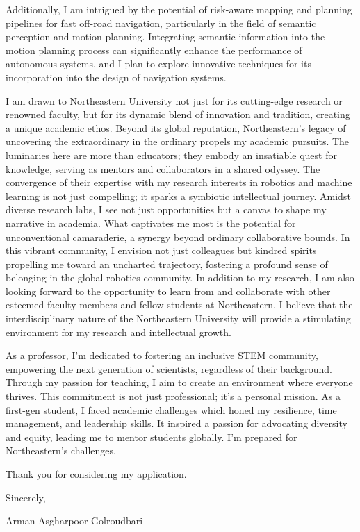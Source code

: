 \documentclass[a4,20pt]{article}
\begin{document}
\begin{large}
Additionally, I am intrigued by the potential of risk-aware mapping and planning pipelines for fast off-road navigation, particularly in the field of semantic perception and motion planning. Integrating semantic information into the motion planning process can significantly enhance the performance of autonomous systems, and I plan to explore innovative techniques for its incorporation into the design of navigation systems.






I am drawn to Northeastern University not just for its cutting-edge research or renowned faculty, but for its dynamic blend of innovation and tradition, creating a unique academic ethos. Beyond its global reputation, Northeastern's legacy of uncovering the extraordinary in the ordinary propels my academic pursuits. The luminaries here are more than educators; they embody an insatiable quest for knowledge, serving as mentors and collaborators in a shared odyssey. The convergence of their expertise with my research interests in robotics and machine learning is not just compelling; it sparks a symbiotic intellectual journey. Amidst diverse research labs, I see not just opportunities but a canvas to shape my narrative in academia. What captivates me most is the potential for unconventional camaraderie, a synergy beyond ordinary collaborative bounds. In this vibrant community, I envision not just colleagues but kindred spirits propelling me toward an uncharted trajectory, fostering a profound sense of belonging in the global robotics community. In addition to my research, I am also looking forward to the opportunity to learn from and collaborate with other esteemed faculty members and fellow students at Northeastern. I believe that the interdisciplinary nature of the Northeastern University will provide a stimulating environment for my research and intellectual growth.

As a professor, I'm dedicated to fostering an inclusive STEM community, empowering the next generation of scientists, regardless of their background. Through my passion for teaching, I aim to create an environment where everyone thrives. This commitment is not just professional; it's a personal mission. As a first-gen student, I faced academic challenges which honed my resilience, time management, and leadership skills. It inspired a passion for advocating diversity and equity, leading me to mentor students globally. I'm prepared for Northeastern's challenges.



\vspace{0.15cm}
Thank you for considering my application.\vspace{-0.1cm}

Sincerely, \vspace{-0.1cm}

Arman Asgharpoor Golroudbari


\end{large}
\end{document}
